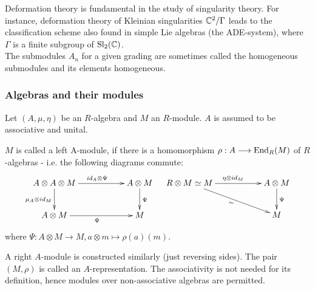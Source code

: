 \bmk Deformation theory is fundamental in the study of singularity theory. For instance, deformation theory of Kleinian singularities $\mathbb{C}^2/\Gamma$ leads to the classification scheme also found in simple Lie algebras (the ADE-system), where $\Gamma$ is a finite subgroup of $\mathrm{Sl}_2(\mathbb{C})$.\\
\indent The submodules $A_n$ for a given grading are sometimes called the homogeneous submodules and its elements homogeneous.
\subsubsection{Algebras and their modules}
Let $(A,\mu,\eta)$ be an $R$-algebra and $M$ an $R$-module. $A$ is assumed to be associative and unital.
\begin{defi}
$M$ is called a left A-module, if there is a homomorphism $\rho : A \longrightarrow \mathrm{End}_R(M)$ of $R$-algebras - i.e. the following diagrams commute:
$$\bao{cc}
\xymatrix{
A \otimes A \otimes M \ar[rr]^{\id_A \otimes \Psi}\ar[d]_{\mu_A \otimes id_M} && A \otimes M \ar[d]^\Psi\\
A \otimes M\ar[rr]_\Psi && M\\
} & 
\xymatrix{
R \otimes M \simeq M \ar[rrd]_\sim \ar[rr]^{\eta \otimes id_M} && A \otimes M \ar[d]^\Psi \\
&&M\\
}
\ea$$
where $\Psi : A \otimes M \longrightarrow M, a \otimes m \longmapsto \rho(a)(m)$.
\end{defi}
\bmk A right $A$-module is constructed similarly (just reversing sides). The pair $(M,\rho)$ is called an $A$-representation. The associativity is not needed for its definition, hence modules over non-associative algebras are permitted.
